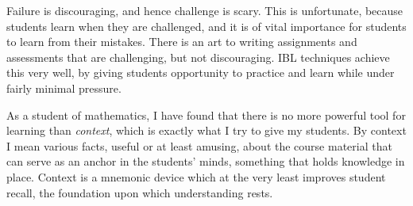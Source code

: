 \documentclass[11pt]{article}
\begin{document}
Failure is discouraging, and hence challenge is scary. This is unfortunate,
because students learn when they are challenged, and it is of vital importance
for students to learn from their mistakes. There is an art to writing
assignments and assessments that are challenging, but not discouraging. IBL
techniques achieve this very well, by giving students opportunity to practice
and learn while under fairly minimal pressure.

As a student of mathematics, I have found that there is no more powerful tool
for learning than \emph{context}, which is exactly what I try to give my
students. By context I mean various facts, useful or at least amusing, about the
course material that can serve as an anchor in the students' minds, something
that holds knowledge in place. Context is a mnemonic device which at the
very least improves student recall, the foundation upon which
understanding rests.
\end{document}
